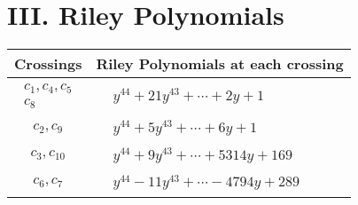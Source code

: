 \documentclass[1p]{elsarticle_modified}
\theoremstyle{definition}
\begin{document}
\centering \section*{ III. Riley Polynomials}
\begin{tabular}{m{50pt}|m{274pt}}
Crossings & \hspace{64pt}Riley Polynomials at each crossing \\
\hline $$\begin{aligned}c_{1},c_{4},c_{5}\\c_{8}\end{aligned}$$&$\begin{aligned}
&y^{44}+21 y^{43}+\cdots+2 y+1
\end{aligned}$\\
\hline $$\begin{aligned}c_{2},c_{9}\end{aligned}$$&$\begin{aligned}
&y^{44}+5 y^{43}+\cdots+6 y+1
\end{aligned}$\\
\hline $$\begin{aligned}c_{3},c_{10}\end{aligned}$$&$\begin{aligned}
&y^{44}+9 y^{43}+\cdots+5314 y+169
\end{aligned}$\\
\hline $$\begin{aligned}c_{6},c_{7}\end{aligned}$$&$\begin{aligned}
&y^{44}-11 y^{43}+\cdots-4794 y+289
\end{aligned}$\\
\hline
\end{tabular}
\vskip 2pc
\end{document}
